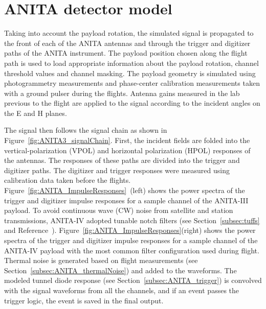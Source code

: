 \section{ANITA detector model}
\label{sec:ANITA}
Taking into account the payload rotation, the simulated signal is
propagated to the front of each of the ANITA antennas and through the trigger and digitizer paths of the ANITA instrument.
The payload position chosen along the flight path is used to load appropriate information about the payload rotation, channel threshold values and channel masking.
The payload geometry is simulated using photogrammetry measurements
and phase-center calibration measurements taken with a ground pulser
during the flights.
Antenna gains measured in the lab previous to the flight are
applied to the signal according to the incident angles on the E and H planes. 

The signal then follows the signal chain as shown in
Figure~\ref{fig:ANITA3_signalChain}.
First, the incident fields are folded into the vertical-polarization (VPOL) and horizontal polarization (HPOL) responses of the antennas. 
The responses of these paths are divided into the trigger and digitizer
paths.
The digitizer and trigger responses were measured using calibration data taken before
the flights. 
Figure~\ref{fig:ANITA_ImpulseResponses}~(left) shows the
power spectra of the trigger and digitizer impulse responses for a
sample channel of the ANITA-III payload.
To avoid continuous wave (CW) noise from satellite and station transmissions, ANITA-IV adopted 
tunable notch filters (see Section~\ref{subsec:tuffs} and Reference~\cite{Allison:2017vtk}).
Figure~\ref{fig:ANITA_ImpulseResponses}(right) shows the
power spectra of the trigger and digitizer impulse responses for a
sample channel of the ANITA-IV payload with the most common filter configuration used during flight.
Thermal noise is generated based on flight measurements (see Section~\ref{subsec:ANITA_thermalNoise}) and added to the waveforms.
The modeled tunnel diode response (see Section~\ref{subsec:ANITA_trigger}) is convolved with the signal waveforms from all the channels, and if an event passes the trigger logic, the event is saved in the final output.

